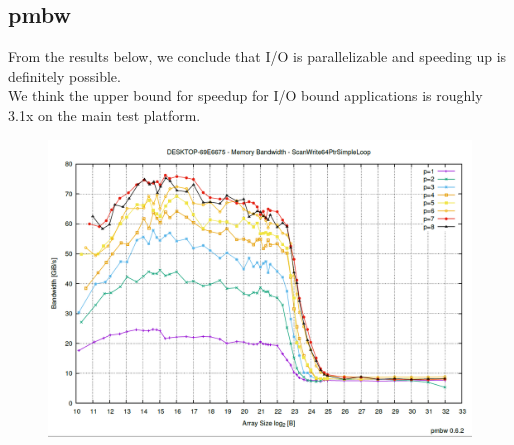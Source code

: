 \documentclass{acm_proc_article-sp}
\begin{document}
\subsection{pmbw}
From the results below, we conclude that I/O is parallelizable and speeding up is definitely possible. \\
We think the upper bound for speedup for I/O bound applications is roughly 3.1x on the main test platform.
\begin{figure}[H]
  \includegraphics[width=\linewidth,natwidth=1211,natheight=850]{pmbw.png}
  \label{fig:pmbw}
\end{figure}
\end{document}
